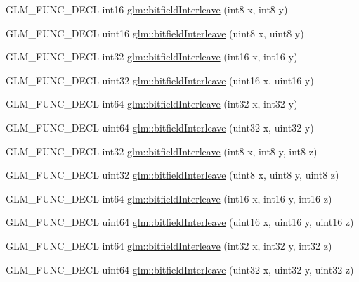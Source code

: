 \begin{DoxyCompactItemize}
\item 
G\+L\+M\+\_\+\+F\+U\+N\+C\+\_\+\+D\+E\+CL int16 \hyperlink{group__gtc__bitfield_ga479134317bc95d99f2b2e235d3db287b}{glm\+::bitfield\+Interleave} (int8 x, int8 y)
\item 
G\+L\+M\+\_\+\+F\+U\+N\+C\+\_\+\+D\+E\+CL uint16 \hyperlink{group__gtc__bitfield_ga0700a3ceb088a0ecc23d76c154096061}{glm\+::bitfield\+Interleave} (uint8 x, uint8 y)
\item 
G\+L\+M\+\_\+\+F\+U\+N\+C\+\_\+\+D\+E\+CL int32 \hyperlink{group__gtc__bitfield_ga1a0264598647ae00a596865af4e1e878}{glm\+::bitfield\+Interleave} (int16 x, int16 y)
\item 
G\+L\+M\+\_\+\+F\+U\+N\+C\+\_\+\+D\+E\+CL uint32 \hyperlink{group__gtc__bitfield_ga19ef8360379483e3ee245e89cb62ff93}{glm\+::bitfield\+Interleave} (uint16 x, uint16 y)
\item 
G\+L\+M\+\_\+\+F\+U\+N\+C\+\_\+\+D\+E\+CL int64 \hyperlink{group__gtc__bitfield_ga0de51d5985e6a703f305a5a61479babd}{glm\+::bitfield\+Interleave} (int32 x, int32 y)
\item 
G\+L\+M\+\_\+\+F\+U\+N\+C\+\_\+\+D\+E\+CL uint64 \hyperlink{group__gtc__bitfield_ga2bc87fd66f6f8471c1a46888360cef12}{glm\+::bitfield\+Interleave} (uint32 x, uint32 y)
\item 
G\+L\+M\+\_\+\+F\+U\+N\+C\+\_\+\+D\+E\+CL int32 \hyperlink{group__gtc__bitfield_ga6dee2ce1c45805063bb7fc5f6fd8f5ca}{glm\+::bitfield\+Interleave} (int8 x, int8 y, int8 z)
\item 
G\+L\+M\+\_\+\+F\+U\+N\+C\+\_\+\+D\+E\+CL uint32 \hyperlink{group__gtc__bitfield_gab9d593a2e916beb8f8137a0dbeae3afe}{glm\+::bitfield\+Interleave} (uint8 x, uint8 y, uint8 z)
\item 
G\+L\+M\+\_\+\+F\+U\+N\+C\+\_\+\+D\+E\+CL int64 \hyperlink{group__gtc__bitfield_gaf898f842ac089fcc8d6201c32702584a}{glm\+::bitfield\+Interleave} (int16 x, int16 y, int16 z)
\item 
G\+L\+M\+\_\+\+F\+U\+N\+C\+\_\+\+D\+E\+CL uint64 \hyperlink{group__gtc__bitfield_ga3c170e2ec54f2faab5e1c5bb693d718d}{glm\+::bitfield\+Interleave} (uint16 x, uint16 y, uint16 z)
\item 
G\+L\+M\+\_\+\+F\+U\+N\+C\+\_\+\+D\+E\+CL int64 \hyperlink{group__gtc__bitfield_ga64e2d84f6560af3cc639644b1e628c42}{glm\+::bitfield\+Interleave} (int32 x, int32 y, int32 z)
\item 
G\+L\+M\+\_\+\+F\+U\+N\+C\+\_\+\+D\+E\+CL uint64 \hyperlink{group__gtc__bitfield_ga7c10eb37f608365cfaef5ca2c476e1ce}{glm\+::bitfield\+Interleave} (uint32 x, uint32 y, uint32 z)
\item 

\end{DoxyCompactItemize}
